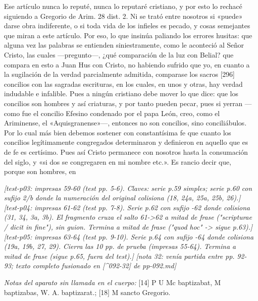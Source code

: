 Ese artículo nunca lo reputé, nunca lo reputaré cristiano, y por esto lo rechacé siguiendo a Gregorio de Arim. 28 dist. 2. Ni se trató entre nosotros si «puede» darse obra indiferente, o si toda vida de los infieles es pecado, y cosas semejantes que miran a este artículo. Por eso, lo que insinúa paliando los errores husitas: que alguna vez las palabras se entienden siniestramente, como le aconteció al Señor Cristo, las cuales —pregunto—, ¿qué comparación de la luz con Belial? que compara en esto a Juan Hus con Cristo, no habiendo sufrido que yo, en cuanto a la sugilación de la verdad parcialmente admitida, comparase los sacros [296] concilios con las sagradas escrituras, en los cuales, en unos y otras, hay verdad indudable e infalible. Pues a ningún cristiano debe mover lo que dice: que los concilios son hombres y así criaturas, y por tanto pueden pecar, pues si yerran —como fue el concilio Efesino condenado por el papa León, creo, como el Ariminense, el «Aquisgranense»—, entonces no son concilios, sino conciliábulos. Por lo cual más bien debemos sostener con constantísima fe que cuanto los concilios legítimamente congregados determinaron y definieron en aquello que es de fe es certísimo. Pues así Cristo permanece con nosotros hasta la consumación del siglo, y «si dos se congregaren en mi nombre etc.». Es rancio decir que, porque son hombres, en

\noindent\textit{[test-p03: impresas 59-60 (test pp. 5-6). Claves: serie p.59 simples; serie p.60 con sufijo 2/b donde la numeración del original colisiona (18, 24a, 25a, 25b, 26).]}
\noindent\textit{[test-p04: impresas 61-62 (test pp. 7-8). Serie p.62 con sufijo -62 donde colisiona (31, 34, 3a, 3b). El fragmento cruza el salto 61->62 a mitad de frase ("scripturae / dicit in fine"), sin guion. Termina a mitad de frase ("quod hoc" -> sigue p.63).]}
\noindent\textit{[test-p05: impresas 63-64 (test pp. 9-10). Serie p.64 con sufijo -64 donde colisiona (19a, 19b, 27, 29). Cierra las 10 pp. de prueba (impresas 55-64). Termina a mitad de frase (sigue p.65, fuera del test).]}
\noindent\textit{[nota 32: venía partida entre pp. 92-93; texto completo fusionado en [\textasciicircum{}092-32] de pp-092.md]}

\noindent\textit{Notas del aparato sin llamada en el cuerpo:} [14] P U Mc baptizabat, M baptizabas, W. A. baptizarat.; [18] M sancto Gregorio.
